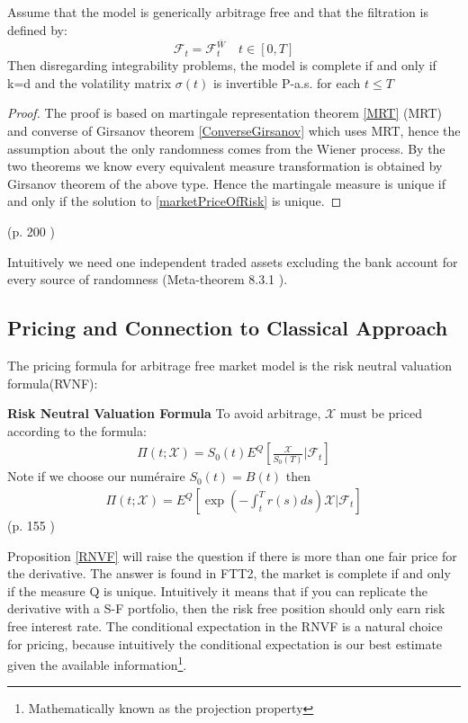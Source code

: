 \begin{proposition}{}\label{completeProp}
Assume that the model is generically arbitrage free and that the filtration is defined by:
$$\mathcal{F}_t=\mathcal{F}_t^{\bar{W}} \quad t \in [0,T]$$
Then disregarding integrability problems, the model is complete if and only if k=d and the volatility matrix $\sigma(t)$ is invertible P-a.s. for each $t \leq T$
\begin{proof}
The proof is based on martingale representation theorem \ref{MRT} (MRT) and converse of Girsanov theorem \ref{ConverseGirsanov} which uses MRT, hence the assumption about the only randomness comes from the Wiener process. By the two theorems we know every equivalent measure transformation is obtained by Girsanov theorem of the above type. Hence the martingale measure is unique if and only if the solution to \eqref{marketPriceOfRisk} is unique.                                        
\end{proof}
\null \hfill (p. 200 \parencite{finKont})
\end{proposition}
Intuitively we need one independent traded assets excluding the bank account for every source of randomness (Meta-theorem 8.3.1 \parencite{finKont}).


\subsection{Pricing and Connection to Classical Approach}
The pricing formula for arbitrage free market model is the risk neutral valuation formula(RVNF):
\begin{proposition}{\textbf{Risk Neutral Valuation Formula}}\label{RNVF}
To avoid arbitrage, $\mathcal{X}$ must be priced according to the formula:
\begin{align}
\Pi(t;\mathcal{X})=S_0(t)E^Q[\frac{\mathcal{X}}{S_0(T)}|\mathcal{F}_t]
\end{align}
Note if we choose our numéraire $S_0(t)=B(t)$ then
\begin{align}
\Pi(t;\mathcal{X})=E^Q[\exp(-\int_t^T r(s) ds) \mathcal{X}|\mathcal{F}_t]
\end{align}
\null \hfill(p. 155 \parencite{finKont})
\end{proposition}
Proposition \ref{RNVF} will raise the question if there is more than one fair price for the derivative. The answer is found in FTT2, the market is complete if and only if the measure Q is unique. Intuitively it means that if you can replicate the derivative with a S-F portfolio, then the risk free position should only earn risk free interest rate. The conditional expectation in the RNVF is a natural choice for pricing, because intuitively the conditional expectation is our best estimate given the available information\footnote{Mathematically known as the projection property}.\\

